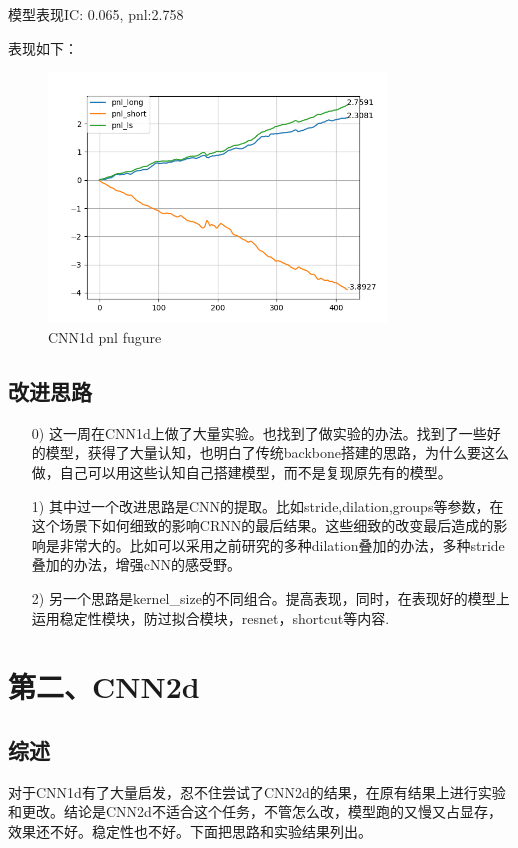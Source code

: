 \documentclass[11pt]{ctexart}
\begin{document}
模型表现{\kaishu \small IC: 0.065, pnl:2.758}

表现如下：
\begin{figure}[H]

\begin{center}
\includegraphics[width=0.8\textwidth]{1.PNG}
\end{center}
\caption{CNN1d pnl fugure}
\label{FIG.2}
\end{figure}

\subsection{改进思路}
\begin{itemize}
  \item [0)]
    这一周在CNN1d上做了大量实验。也找到了做实验的办法。找到了一些好的模型，获得了大量认知，也明白了传统backbone搭建的思路，为什么要这么做，自己可以用这些认知自己搭建模型，而不是复现原先有的模型。
  \item [1)]
    其中过一个改进思路是CNN的提取。比如stride,dilation,groups等参数，在这个场景下如何细致的影响CRNN的最后结果。这些细致的改变最后造成的影响是非常大的。比如可以采用之前研究的多种dilation叠加的办法，多种stride叠加的办法，增强cNN的感受野。
  \item [2)]
    另一个思路是kernel\_size的不同组合。提高表现，同时，在表现好的模型上运用稳定性模块，防过拟合模块，resnet，shortcut等内容.
\end{itemize}


\section{第二、CNN2d}
\subsection{综述}
对于CNN1d有了大量启发，忍不住尝试了CNN2d的结果，在原有结果上进行实验和更改。结论是CNN2d不适合这个任务，不管怎么改，模型跑的又慢又占显存，效果还不好。稳定性也不好。下面把思路和实验结果列出。
\end{document}
